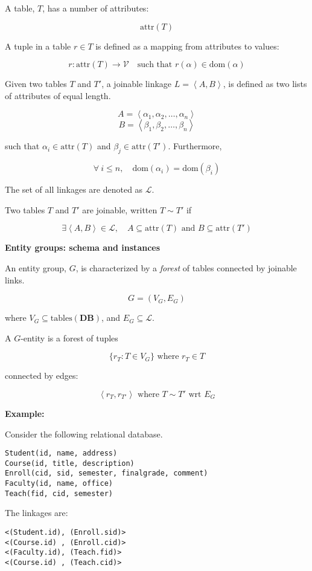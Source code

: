\documentclass[conference]{IEEEtran}
\newcommand{\DB}{\mathbf{DB}}
\newcommand{\attr}{\mathrm{attr}}
\newcommand{\Val}{\mathcal{V}}
\newcommand{\dom}{\mathrm{dom}}
\newcommand{\Tables}{\mathrm{tables}}
\begin{document}
A table, $T$, has a number of attributes:

$$ \attr(T) $$

A tuple in a table $r\in T$ is defined as a mapping from attributes to values:

$$ r:\attr(T)\to\Val\quad \mbox{such that } r(\alpha)\in\dom(\alpha) $$

Given two tables $T$ and $T'$, a joinable linkage $L=\left<A,B\right>$, is defined as two lists of attributes of equal length.

$$A = \left<\alpha_1, \alpha_2, \dots, \alpha_n\right>$$
$$B = \left<\beta_1, \beta_2, \dots, \beta_n\right>$$

such that $\alpha_i\in\attr(T)$ and $\beta_j\in\attr(T')$.  Furthermore,

$$ \forall\ i\leq n,\quad \dom(\alpha_i) = \dom(\beta_i)$$

The set of all linkages are denoted as $\mathcal{L}$.

Two tables $T$ and $T'$ are joinable, written $T\sim T'$ if

$$\exists\left<A, B\right>\in\mathcal{L},\quad A\subseteq\attr(T)\mbox{ and } B\subseteq\attr(T')$$

\textbf{Entity groups: schema and instances}

An {entity group}, $G$, is characterized by a {\em forest} of tables connected by joinable links.

$$G = (V_G, E_G)$$

where $V_G \subseteq \Tables(\DB)$, and $E_G\subseteq\mathcal{L}$.

A $G$-entity is a forest of tuples 

$$\{r_T : T\in V_G\} \mbox{ where } r_T\in T$$

connected by edges:

$$\left<r_T, r_{T'}\right> \mbox{ where } T\sim T' \mbox{ wrt } E_G$$

{\bf Example:}

Consider the following relational database.

\begin{verbatim}
Student(id, name, address)
Course(id, title, description)
Enroll(cid, sid, semester, finalgrade, comment)
Faculty(id, name, office)
Teach(fid, cid, semester)
\end{verbatim}

The linkages are:

\begin{verbatim}
<(Student.id), (Enroll.sid)>
<(Course.id) , (Enroll.cid)>
<(Faculty.id), (Teach.fid)>
<(Course.id) , (Teach.cid)>
\end{verbatim}
\end{document}
